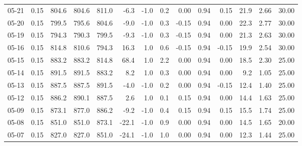 \begin{threeparttable}
{\begin{tabular}{lrrrrrrrrrrrrr}
  05-21 &     0.15 & 804.6 & 804.6 & 811.0 &       -6.3 &                     -1.0 &                 0.2 &       0.00 &      0.94 &           0.15 &             21.9 &            2.66 &                  30.00 \\
  05-20 &     0.15 & 799.5 & 795.6 & 804.6 &       -9.0 &                     -1.0 &                 0.3 &      -0.15 &      0.94 &           0.00 &             22.3 &            2.77 &                  30.00 \\
  05-19 &     0.15 & 794.3 & 790.3 & 799.5 &       -9.3 &                     -1.0 &                 0.3 &      -0.15 &      0.94 &           0.00 &             21.3 &            2.63 &                  30.00 \\
  05-16 &     0.15 & 814.8 & 810.6 & 794.3 &       16.3 &                      1.0 &                 0.6 &      -0.15 &      0.94 &          -0.15 &             19.9 &            2.54 &                  30.00 \\
  05-15 &     0.15 & 883.2 & 883.2 & 814.8 &       68.4 &                      1.0 &                 2.2 &       0.00 &      0.94 &           0.00 &             18.5 &            2.30 &                  25.00 \\
  05-14 &     0.15 & 891.5 & 891.5 & 883.2 &        8.2 &                      1.0 &                 0.3 &       0.00 &      0.94 &           0.00 &              9.2 &            1.05 &                  25.00 \\
  05-13 &     0.15 & 887.5 & 887.5 & 891.5 &       -4.0 &                     -1.0 &                 0.2 &       0.00 &      0.94 &          -0.15 &             12.4 &            1.40 &                  25.00 \\
  05-12 &     0.15 & 886.2 & 890.1 & 887.5 &        2.6 &                      1.0 &                 0.1 &       0.15 &      0.94 &           0.00 &             14.4 &            1.63 &                  25.00 \\
  05-09 &     0.15 & 873.1 & 877.0 & 886.2 &       -9.2 &                     -1.0 &                 0.4 &       0.15 &      0.94 &           0.15 &             15.5 &            1.74 &                  25.00 \\
  05-08 &     0.15 & 851.0 & 851.0 & 873.1 &      -22.1 &                     -1.0 &                 0.9 &       0.00 &      0.94 &           0.00 &             14.5 &            1.65 &                  20.00 \\
  05-07 &     0.15 & 827.0 & 827.0 & 851.0 &      -24.1 &                     -1.0 &                 1.0 &       0.00 &      0.94 &           0.00 &             12.3 &            1.44 &                  25.00 \\

\end{tabular}}
\end{threeparttable}
